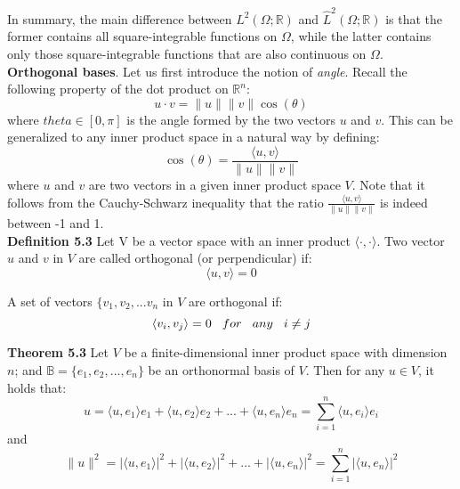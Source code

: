 \documentclass[12pt]{article} %
\begin{document}
In summary, the main difference between $L^2(\Omega; \mathbb{R})$ and $\hat{L}^2(\Omega; \mathbb{R})$ is that the former contains all square-integrable functions on $\Omega$, while the latter contains only those square-integrable functions that are also continuous on $\Omega$.\\
\textbf{Orthogonal bases}. Let us first introduce the notion of \textit{angle}. Recall the following property of the dot product on $\mathbb{R}^{n}$:
$$
u \cdot v = \|u\| \|v\| \cos (\theta)
$$where $theta \in [0, \pi]$ is the angle formed by the two vectors $u$ and $v$. This can be generalized to any inner product space in a natural way by defining:
$$
\cos(\theta) = \frac{\langle u, v\rangle}{\|u\| \|v\|}
$$where $u$ and $v$ are two vectors in a given inner product space $V$. Note that it follows from the Cauchy-Schwarz inequality that the ratio $ \frac{\langle u, v\rangle}{\|u\| \|v\|}$ is indeed between -1 and 1.\\
\textbf{Definition 5.3} Let V be a vector space with an inner product $\langle \cdot,\cdot \rangle$. Two vector $u$ and $v$ in $V$ are called orthogonal (or perpendicular) if:
$$
\langle u, v\rangle =0
$$\par
A set of vectors $\{v_{1}, v_{2}, ...v_{n}$ in $V$ are orthogonal if:
$$
\langle v_{i}, v_{j}\rangle = 0 \hspace{3mm} for \hspace{3mm} any \hspace{3mm} i \neq j
$$\par
\textbf{Theorem 5.3} Let $V$ be a finite-dimensional inner product space with dimension $n$; and $\mathbb{B} = \{ e_{1}, e_{2}, ..., e_{n}\}$ be an orthonormal basis of $V$. Then for any $u \in V$, it holds that:
$$
u = \langle u, e_{1}\rangle e_{1}+\langle u, e_{2}\rangle e_{2}+ ...+\langle u, e_{n}\rangle e_{n} = \sum_{i=1}^{n}\langle u, e_{i}\rangle e_{i}
$$and 
$$
\|u\|^{2} = | \langle u, e_{1}\rangle  |^{2}+ | \langle u, e_{2}\rangle  |^{2}+...+| \langle u, e_{n}\rangle  |^{2}=\sum_{i=1}^{n}| \langle u, e_{n}\rangle  |^{2}
$$\par
\end{document}
